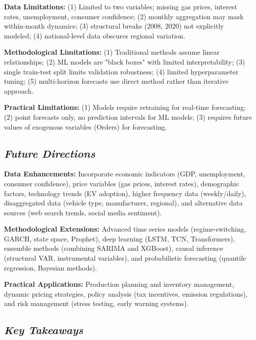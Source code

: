 \documentclass[12pt]{article}
\begin{document}
\textbf{Data Limitations:} (1) Limited to two variables; missing gas prices, interest rates, unemployment, consumer confidence; (2) monthly aggregation may mask within-month dynamics; (3) structural breaks (2008, 2020) not explicitly modeled; (4) national-level data obscures regional variation.

\textbf{Methodological Limitations:} (1) Traditional methods assume linear relationships; (2) ML models are "black boxes" with limited interpretability; (3) single train-test split limits validation robustness; (4) limited hyperparameter tuning; (5) multi-horizon forecasts use direct method rather than iterative approach.

\textbf{Practical Limitations:} (1) Models require retraining for real-time forecasting; (2) point forecasts only, no prediction intervals for ML models; (3) requires future values of exogenous variables (Orders) for forecasting.

\subsection*{\textit{Future Directions}}

\textbf{Data Enhancements:} Incorporate economic indicators (GDP, unemployment, consumer confidence), price variables (gas prices, interest rates), demographic factors, technology trends (EV adoption), higher frequency data (weekly/daily), disaggregated data (vehicle type, manufacturer, regional), and alternative data sources (web search trends, social media sentiment).

\textbf{Methodological Extensions:} Advanced time series models (regime-switching, GARCH, state space, Prophet), deep learning (LSTM, TCN, Transformers), ensemble methods (combining SARIMA and XGBoost), causal inference (structural VAR, instrumental variables), and probabilistic forecasting (quantile regression, Bayesian methods).

\textbf{Practical Applications:} Production planning and inventory management, dynamic pricing strategies, policy analysis (tax incentives, emission regulations), and risk management (stress testing, early warning systems).

\subsection*{\textit{Key Takeaways}}
\end{document}
